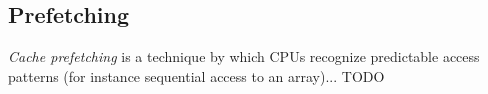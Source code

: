 \subsection{Prefetching}
\label{sec:prefetch}

\emph{Cache prefetching} is a technique by which CPUs recognize predictable access
patterns (for instance sequential access to an array)... TODO

